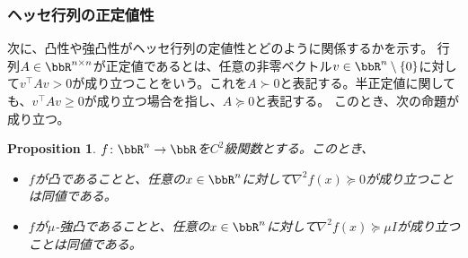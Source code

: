 \documentclass[a4paper, 10pt, dvipdfmx,draft]{article}
\newtheorem{proposition}{Proposition}
\begin{document}
\subsubsection{ヘッセ行列の正定値性}

次に、凸性や強凸性がヘッセ行列の定値性とどのように関係するかを示す。
行列$A \in \bbR^{n \times n}$が正定値であるとは、任意の非零ベクトル$v \in \bbR^n \setminus \{0\}$に対して$v^\top A v > 0$が成り立つことをいう。これを$A \succ 0$と表記する。半正定値に関しても、$v^\top A v \ge 0$が成り立つ場合を指し、$A \succeq 0$と表記する。
このとき、次の命題が成り立つ。

\begin{proposition}\label{prop:convexity-hessian}
    $f \colon \bbR^n \to \bbR$を$C^2$級関数とする。このとき、
    \begin{itemize}
        \item $f$が凸であることと、任意の$x \in \bbR^n$に対して$\nabla^2 f(x)\succeq0$が成り立つことは同値である。
        \item $f$が$\mu$-強凸であることと、任意の$x \in \bbR^n$に対して$\nabla^2 f(x)\succeq\mu I$が成り立つことは同値である。
    \end{itemize}
\end{proposition}
\end{document}
